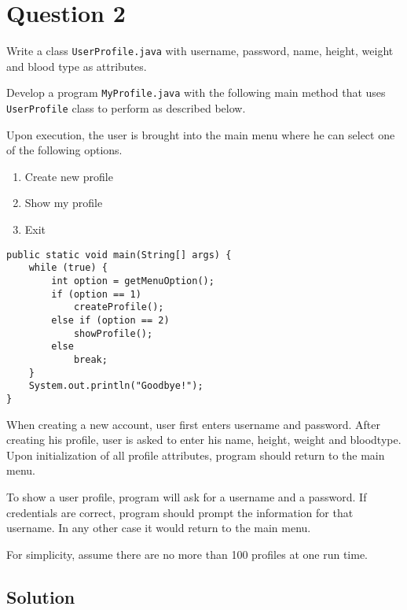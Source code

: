 \documentclass[12pt,letterpaper,twoside]{article}
\begin{document}
\section*{Question 2}

Write a class \texttt{UserProfile.java} with username, password, name, height, weight and blood type as attributes.

Develop a program \texttt{MyProfile.java} with the following main method that uses \texttt{UserProfile} class to perform as described below.

Upon execution, the user is brought into the main menu where he can select one of the following options.
\begin{enumerate}[itemsep=0pt]
\parskip=0pt \parsep=0pt
\item Create new profile
\item Show my profile
\item Exit
\end{enumerate}

\lstset{language=java}
\begin{lstlisting}
public static void main(String[] args) {
	while (true) {
		int option = getMenuOption();
		if (option == 1)
			createProfile();
		else if (option == 2)
			showProfile();
		else
			break;
	}
	System.out.println("Goodbye!");
}
\end{lstlisting}

When creating a new account, user first enters username and password. After creating his profile, user is asked to enter his name, height, weight and bloodtype. Upon initialization of all profile attributes, program should return to the main menu.

To show a user profile, program will ask for a username and a password. If credentials are correct, program should prompt the information for that username. In any other case it would return to the main menu.

For simplicity, assume there are no more than 100 profiles at one run time.

\subsection*{Solution}
\end{document}
